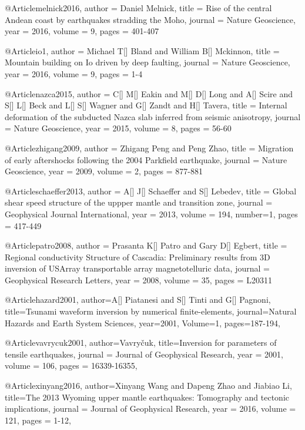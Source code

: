 @Article{melnick2016,
  author = 	 {Daniel Melnick},
  title = 	 {Rise of the central Andean coast by earthquakes stradding the Moho},
  journal = 	 {Nature Geoscience},
  year = 	 2016,
  volume = 9,
  pages =	 {401-407}
}

@Article{io1,
  author = 	 {Michael T[] Bland and William B[] Mckinnon},
  title = 	 {Mountain building on {I}o driven by deep faulting},
  journal = 	 {Nature Geoscience},
  year = 	 2016,
  volume = 9,
  pages =	 {1-4}
}

@Article{nazca2015,
  author = 	 {C[] M[] Eakin and M[] D[] Long and A[] Scire and S[] L[] Beck and L[] S[] Wagner and G[] Zandt and H[] Tavera},
  title = 	 {Internal deformation of the subducted Nazca slab inferred from seismic anisotropy},
  journal = 	 {Nature Geoscience},
  year = 	 2015,
  volume = 8,
  pages =	 {56-60}
}

@Article{zhigang2009,
  author = 	 {Zhigang Peng and Peng Zhao},
  title = 	 {Migration of early aftershocks following the 2004 Parkfield earthquake},
  journal = 	 {Nature Geoscience},
  year = 	 2009,
  volume = 2,
  pages =	 {877-881}
}

@Article{schaeffer2013,
  author = 	 {A[] J[] Schaeffer and S[] Lebedev},
  title = 	 {Global shear speed structure of the uppper mantle and transition zone},
  journal = 	 {Geophysical Journal International},
  year = 	 2013,
  volume = 194,
  number=1,
  pages =	 {417-449}
}

@Article{patro2008,
  author = 	 {Prasanta K[] Patro and Gary D[] Egbert},
  title = 	 {Regional conductivity Structure of Cascadia: Preliminary results from 3D inversion of USArray transportable array magnetotelluric data},
  journal = 	 {Geophysical Research Letters},
  year = 	 2008,
  volume = 35,
  pages =	 {L20311}
}

@Article{hazard2001,
  author={A[] Piatanesi and S[] Tinti and G[] Pagnoni},
  title={Tsunami waveform inversion by numerical finite-elements},
  journal={Natural Hazards and Earth System Sciences},
  year=2001,
  Volume=1,
  pages={187-194},
}

@Article{vavrycuk2001,
  author={Vavry\v{c}uk},
  title={Inversion for parameters of tensile earthquakes},
  journal = 	 {Journal of Geophysical Research},
  year = 	 2001,
  volume =	 106,
  pages =	 {16339-16355},
}

@Article{xinyang2016,
  author={Xinyang Wang and Dapeng Zhao and Jiabiao Li},
  title={The 2013 Wyoming upper mantle earthquakes: Tomography and tectonic implications},
  journal = 	 {Journal of Geophysical Research},
  year = 	 2016,
  volume =	 121,
  pages =	 {1-12},
}


